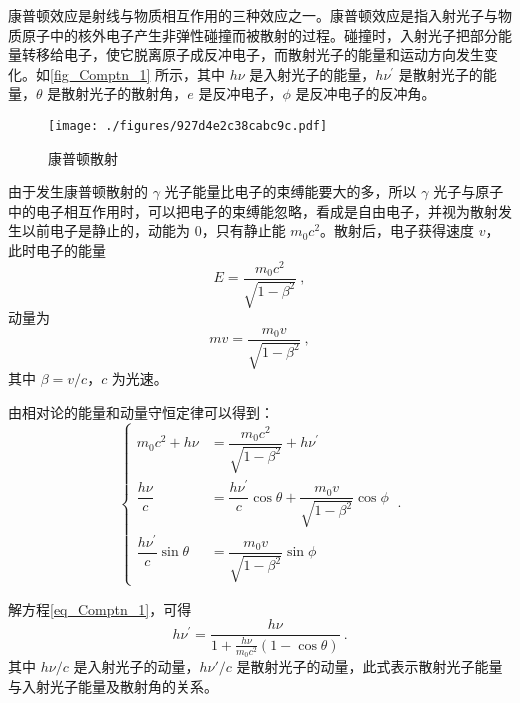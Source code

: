 
\begin{issues}
\issueMissDepend
\end{issues}

康普顿效应是射线与物质相互作用的三种效应之一。康普顿效应是指入射光子与物质原子中的核外电子产生非弹性碰撞而被散射的过程。碰撞时，入射光子把部分能量转移给电子，使它脱离原子成反冲电子，而散射光子的能量和运动方向发生变化。如\autoref{fig_Comptn_1} 所示，其中 $h\nu$ 是入射光子的能量，$h\nu^\prime$ 是散射光子的能量，$\theta$ 是散射光子的散射角，$e$ 是反冲电子，$\phi$ 是反冲电子的反冲角。
\begin{figure}[ht]
\centering
\texttt{[image: ./figures/927d4e2c38cabc9c.pdf]}
\caption{康普顿散射} \label{fig_Comptn_1}
\end{figure}
由于发生康普顿散射的 $\gamma$ 光子能量比电子的束缚能要大的多，所以 $\gamma$ 光子与原子中的电子相互作用时，可以把电子的束缚能忽略，看成是自由电子，并视为散射发生以前电子是静止的，动能为 $0$，只有静止能 $m_0c^2$。散射后，电子获得速度 $v$，此时电子的能量
\begin{equation}
E=\frac{m_{0} c^{2}}{\sqrt{1-\beta^{2}}}~,
\end{equation}
动量为
\begin{equation}
m v=\frac{m_{0} v}{\sqrt{1-\beta^{2}}}~,
\end{equation}
其中 $\beta=v/c$，$c$ 为光速。

由相对论的能量和动量守恒定律可以得到：
\begin{equation} \label{eq_Comptn_1}
\begin{cases}
m_{0} c^{2}+h \nu&=\dfrac{m_{0} c^{2}}{\sqrt{1-\beta^{2}}}+h \nu^{\prime} \\
\dfrac{h \nu}{c}&=\dfrac{h \nu^{\prime}}{c} \cos \theta+\dfrac{m_{0} v}{\sqrt{1-\beta^{2}}} \cos \phi \\
\dfrac{h \nu^{\prime}}{c} \sin \theta&=\dfrac{m_{0} v}{\sqrt{1-\beta^{2}}} \sin \phi
\end{cases}~.
\end{equation}

解方程\autoref{eq_Comptn_1}，可得
\begin{equation}
h \nu^{\prime}=\frac{h \nu}{1+\frac{h \nu}{m_{0} c^{2}}(1-\cos \theta)}~.
\end{equation}
其中 $h\nu / c$ 是入射光子的动量，$h\nu' / c$ 是散射光子的动量，此式表示散射光子能量与入射光子能量及散射角的关系。

